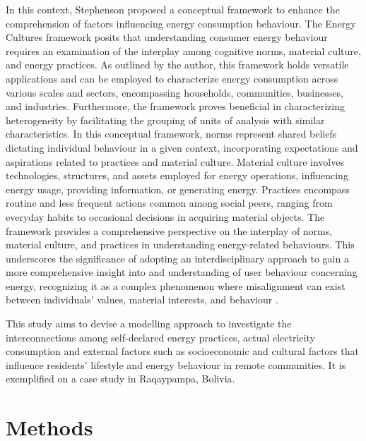 \documentclass[final,3p,times,onecolumn]{elsarticle}
\begin{document}
In this context, Stephenson \cite{stephenson_energy_2010} proposed a conceptual framework to enhance the comprehension of factors influencing energy consumption behaviour. The Energy Cultures framework posits that understanding consumer energy behaviour requires an examination of the interplay among cognitive norms, material culture, and energy practices. As outlined by the author, this framework holds versatile applications and can be employed to characterize energy consumption across various scales and sectors, encompassing households, communities, businesses, and industries. Furthermore, the framework proves beneficial in characterizing heterogeneity by facilitating the grouping of units of analysis with similar characteristics. In this conceptual framework, norms represent shared beliefs dictating individual behaviour in a given context, incorporating expectations and aspirations related to practices and material culture. Material culture involves technologies, structures, and assets employed for energy operations, influencing energy usage, providing information, or generating energy. Practices encompass routine and less frequent actions common among social peers, ranging from everyday habits to occasional decisions in acquiring material objects. The framework provides a comprehensive perspective on the interplay of norms, material culture, and practices in understanding energy-related behaviours. This underscores the significance of adopting an interdisciplinary approach to gain a more comprehensive insight into and understanding of user behaviour concerning energy, recognizing it as a complex phenomenon where misalignment can exist between individuals' values, material interests, and behaviour \cite{kavousian_determinants_2013} \cite{schmidt_interdisciplinary_2015}. 

This study aims to devise a modelling approach to investigate the interconnections among self-declared energy practices, actual electricity consumption and external factors such as socioeconomic and cultural factors that influence residents' lifestyle and energy behaviour in remote communities. It is exemplified on a case study in Raqaypampa, Bolivia.


\section{Methods}
\label{sec:methodology} 
\end{document}
